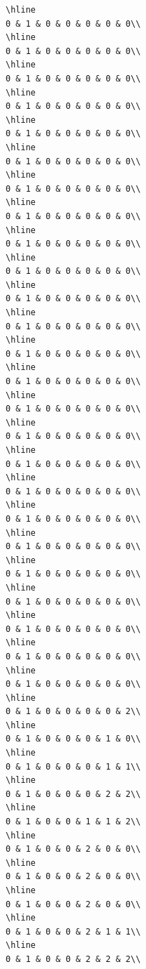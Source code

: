 \documentclass[
]{article}
\begin{document}
\begin{verbatim}
\hline
0 & 1 & 0 & 0 & 0 & 0 & 0\\
\hline
0 & 1 & 0 & 0 & 0 & 0 & 0\\
\hline
0 & 1 & 0 & 0 & 0 & 0 & 0\\
\hline
0 & 1 & 0 & 0 & 0 & 0 & 0\\
\hline
0 & 1 & 0 & 0 & 0 & 0 & 0\\
\hline
0 & 1 & 0 & 0 & 0 & 0 & 0\\
\hline
0 & 1 & 0 & 0 & 0 & 0 & 0\\
\hline
0 & 1 & 0 & 0 & 0 & 0 & 0\\
\hline
0 & 1 & 0 & 0 & 0 & 0 & 0\\
\hline
0 & 1 & 0 & 0 & 0 & 0 & 0\\
\hline
0 & 1 & 0 & 0 & 0 & 0 & 0\\
\hline
0 & 1 & 0 & 0 & 0 & 0 & 0\\
\hline
0 & 1 & 0 & 0 & 0 & 0 & 0\\
\hline
0 & 1 & 0 & 0 & 0 & 0 & 0\\
\hline
0 & 1 & 0 & 0 & 0 & 0 & 0\\
\hline
0 & 1 & 0 & 0 & 0 & 0 & 0\\
\hline
0 & 1 & 0 & 0 & 0 & 0 & 0\\
\hline
0 & 1 & 0 & 0 & 0 & 0 & 0\\
\hline
0 & 1 & 0 & 0 & 0 & 0 & 0\\
\hline
0 & 1 & 0 & 0 & 0 & 0 & 0\\
\hline
0 & 1 & 0 & 0 & 0 & 0 & 0\\
\hline
0 & 1 & 0 & 0 & 0 & 0 & 0\\
\hline
0 & 1 & 0 & 0 & 0 & 0 & 0\\
\hline
0 & 1 & 0 & 0 & 0 & 0 & 0\\
\hline
0 & 1 & 0 & 0 & 0 & 0 & 0\\
\hline
0 & 1 & 0 & 0 & 0 & 0 & 2\\
\hline
0 & 1 & 0 & 0 & 0 & 1 & 0\\
\hline
0 & 1 & 0 & 0 & 0 & 1 & 1\\
\hline
0 & 1 & 0 & 0 & 0 & 2 & 2\\
\hline
0 & 1 & 0 & 0 & 1 & 1 & 2\\
\hline
0 & 1 & 0 & 0 & 2 & 0 & 0\\
\hline
0 & 1 & 0 & 0 & 2 & 0 & 0\\
\hline
0 & 1 & 0 & 0 & 2 & 0 & 0\\
\hline
0 & 1 & 0 & 0 & 2 & 1 & 1\\
\hline
0 & 1 & 0 & 0 & 2 & 2 & 2\\

\end{verbatim}
\end{document}
